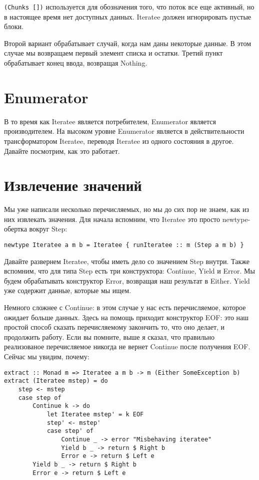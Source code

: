 \lstinline'(Chunks [])' используется для обозначения того, что поток все еще активный, но в настоящее время нет доступных данных. Iteratee должен игнорировать пустые блоки.

Второй вариант обрабатывает случай, когда нам даны некоторые данные. В этом случае мы возвращаем первый элемент списка и остатки. Третий пункт обрабатывает конец ввода, возвращая Nothing.

\section{Enumerator}

В то время как Iteratee является потребителем, Enumerator является производителем. На высоком уровне Enumerator является в действительности трансформатором Iteratee, переводя Iteratee из одного состояния в другое. Давайте посмотрим, как это работает.

\section{Извлечение значений}

Мы уже написали несколько перечисляемых, но мы до сих пор не знаем, как из них извлекать значения. Для начала вспомним, что Iteratee это просто newtype-обертка вокруг Step:

\begin{lstlisting}
newtype Iteratee a m b = Iteratee { runIteratee :: m (Step a m b) }
\end{lstlisting}

Давайте развернем Iteratee, чтобы иметь дело со значением Step внутри. Также вспомним, что для типа Step есть три конструктора: Continue, Yield и Error. Мы будем обрабатывать конструктор Error, возвращая наш результат в Either. Yield уже содержит данные, которые мы ищем.

Немного сложнее с Continue: в этом случае у нас есть перечисляемое, которое ожидает больше данных. Здесь на помощь приходит конструктор EOF: это наш простой способ сказать перечисляемому закончить то, что оно делает, и продолжить работу. Если вы помните, выше я сказал, что правильно реализованое перечисляемое никогда не вернет Continue после получения EOF. Сейчас мы увидим, почему:

\begin{lstlisting}
extract :: Monad m => Iteratee a m b -> m (Either SomeException b)
extract (Iteratee mstep) = do
    step <- mstep
    case step of
        Continue k -> do
            let Iteratee mstep' = k EOF
            step' <- mstep'
            case step' of
                Continue _ -> error "Misbehaving iteratee"
                Yield b _ -> return $ Right b
                Error e -> return $ Left e
        Yield b _ -> return $ Right b
        Error e -> return $ Left e
\end{lstlisting}%

